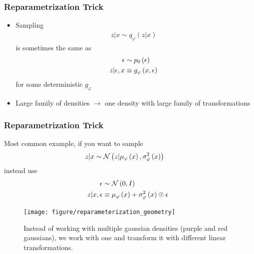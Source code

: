 \documentclass[10pt,mathserif]{beamer}
\begin{document}
\begin{frame}
  \frametitle{Reparametrization Trick}
  \begin{itemize}
  \item Sampling
  \begin{align*}
    z \vert x \sim q_{\varphi}\left(z \vert x\right)
  \end{align*}
  is sometimes the same as
  \begin{align*}
    \epsilon &\sim p_{0}\left(\epsilon\right) \\
    z \vert \epsilon, x &\equiv g_{\varphi}\left(x, \epsilon\right)
  \end{align*}
  for some deterministic $g_{\varphi}$
  \item Large family of densities $\rightarrow$ one density with large family of
    transformations
  \end{itemize}
\end{frame}

\begin{frame}
  \frametitle{Reparametrization Trick}
  Most common example, if you want to sample
  \begin{align*}
    z \vert x &\sim \mathcal{N}\left(z \vert \mu_{\varphi}\left(x\right), \sigma_{\varphi}^{2}\left(x\right)\right)
  \end{align*}
  instead use
  \begin{align*}
    \epsilon &\sim \mathcal{N}\left(0, I\right) \\
    z \vert x, \epsilon &\equiv \mu_{\varphi}\left(x\right) + \sigma_{\varphi}^{2}\left(x\right) \odot \epsilon
  \end{align*}
\begin{figure}[ht]
  \centering
  \texttt{[image: figure/reparameterization\_geometry]}
  \caption{Instead of working with multiple gaussian densities (purple and red
    gaussians), we work with one and transform it with different linear
    transformations. \label{fig:reparameterization_geometry} }
\end{figure}

\end{frame}
\end{document}
